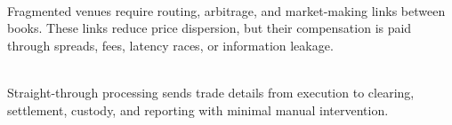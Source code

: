 \documentclass[a4paper,oneside,openany]{book}
\begin{document}
\begin{mechanism} \\
Fragmented venues require routing, arbitrage, and market-making links between books. These links reduce price dispersion, but their compensation is paid through spreads, fees, latency races, or information leakage.
\end{mechanism}

\begin{practitionernote} \\
Straight-through processing sends trade details from execution to clearing, settlement, custody, and reporting with minimal manual intervention.
\end{practitionernote}
\end{document}
